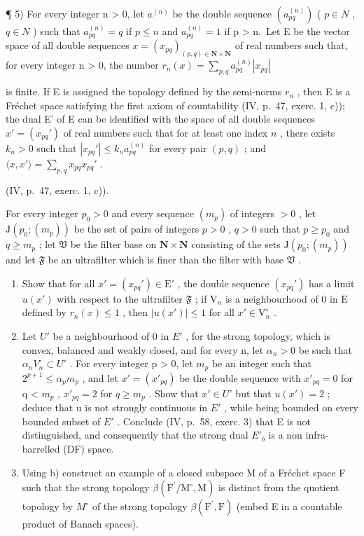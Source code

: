 ¶ 5) For every integer n \textgreater{} 0, let \(a^{(n)}\) be the double sequence \((a_{pq}^{(n)})\) ( \(p \in N\) , \(q \in N\) ) such that \(a_{pq}^{(n)} = q\) if \(p \leqslant n\) and \(a_{pq}^{(n)} = 1\) if p \textgreater{} n.~Let E be the vector space of all double sequences \(x = (x_{pq})_{(p,q) \in \mathbf{N} \times \mathbf{N}}\) of real numbers such that, for every integer n \textgreater{} 0, the number \(r_n(x) = \sum_{p,q} a_{pq}^{(n)} |x_{pq}|\)

is finite. If E is assigned the topology defined by the semi-norms \(r_n\) , then E is a Fréchet space satisfying the first axiom of countability (IV, p.~47, exerc. 1, c)); the dual E' of E can be identified with the space of all double sequences \(x' = (x_{pq}')\) of real numbers such that for at least one index \(n\) , there exists \(k_n > 0\) such that \(|x_{pq}'| \leqslant k_n a_{pq}^{(n)}\) for every pair \((p, q)\) ; and \(\langle x, x' \rangle = \sum_{p, q} x_{pq} x_{pq}'\) .

(IV, p.~47, exerc. 1, c)).

For every integer \(p_0 > 0\) and every sequence \((m_p)\) of integers \(> 0\) , let \(\mathrm{J}(p_0; (m_p))\) be the set of pairs of integers \(p > 0\) , \(q > 0\) such that \(p \geqslant p_0\) and \(q \geqslant m_p\) ; let \(\mathfrak{V}\) be the filter base on \(\mathbf{N} \times \mathbf{N}\) consisting of the sets \(\mathrm{J}(p_0; (m_p))\) and let \(\mathfrak{F}\) be an ultrafilter which is finer than the filter with base \(\mathfrak{V}\) .

\begin{enumerate}
\def\labelenumi{\alph{enumi})}
\item
  Show that for all \(x' = (x_{pq}') \in \mathrm{E}'\) , the double sequence \((x_{pq}')\) has a limit \(u(x')\) with respect to the ultrafilter \(\mathfrak{F}\) ; if \(\mathrm{V}_n\) is a neighbourhood of 0 in \(\mathrm{E}\) defined by \(r_n(x) \leqslant 1\) , then \(|u(x')| \leqslant 1\) for all \(x' \in \mathrm{V}_n^\circ\) .
\item
  Let \(U'\) be a neighbourhood of 0 in \(E'\) , for the strong topology, which is convex, balanced and weakly closed, and for every n, let \(\alpha_{n} > 0\) be such that \(\alpha_{n} V_{n}^{\circ} \subset U'\) . For every integer p \textgreater{} 0, let \(m_{p}\) be an integer such that \(2^{p+1} \leqslant \alpha_{p} m_{p}\) , and let \(x' = (x'_{pq})\) be the double sequence with \(x'_{pq} = 0\) for q \textless{} \(m_{p}\) , \(x'_{pq} = 2\) for \(q \geqslant m_{p}\) . Show that \(x' \in U'\) but that \(u(x') = 2\) ; deduce that u is not strongly continuous in \(E'\) , while being bounded on every bounded subset of \(E'\) . Conclude (IV, p.~58, exerc. 3) that E is not distinguished, and consequently that the strong dual \(E'_{b}\) is a non infra-barrelled (DF) space.
\item
  Using b) construct an example of a closed subspace M of a Fréchet space F such that the strong topology \(\beta(\mathrm{F}^{\prime}/\mathrm{M}^{\circ}, \mathrm{M})\) is distinct from the quotient topology by \(M^{\circ}\) of the strong topology \(\beta(\mathrm{F}^{\prime}, \mathrm{F})\) (embed E in a countable product of Banach spaces).
\end{enumerate}

